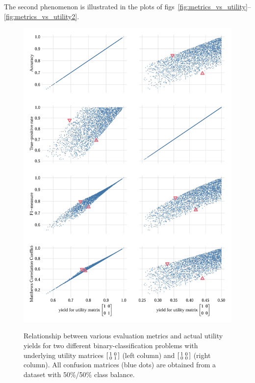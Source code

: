\documentclass[\ifafour a4paper,12pt,\else a5paper,10pt,\fi%
onecolumn,oneside,article,%
british%
]{memoir}
\theoremstyle{remark}
\theoremstyle{innote}
\renewcommand*{\|}[1][]{\nonscript\:#1\vert\nonscript\:\mathopen{}}
\newcommand*{\figs}{figs}%
\newcommand*{\sumatrix}[4]{\begin{bsmallmatrix*}[r]#1&#2\\#3&#4\end{bsmallmatrix*}}
\begin{document}
The second phenomenon is illustrated in the plots of \figs~\ref{fig:metrics_vs_utility}--\ref{fig:metrics_vs_utility2}.
\begin{figure}[p]
  \centering
\includegraphics[width=0.95\linewidth]{utility_vs_metrics2_0.5.jpg}\\%
\caption{Relationship between various evaluation metrics and actual utility yields for two different binary-classification problems with underlying utility matrices $\sumatrix{ 1}{0}{0}{1 }$ (left column) and $\sumatrix{ 1}{0}{0}{0 }$ (right column). All confusion matrices ({\color{mypurpleblue}blue dots}) are obtained from a dataset with 50\%/50\% class balance.
}
\end{figure}
\end{document}
